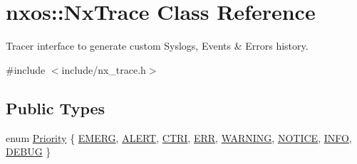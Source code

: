 \hypertarget{classnxos_1_1_nx_trace}{}\section{nxos\+:\+:Nx\+Trace Class Reference}
\label{classnxos_1_1_nx_trace}


Tracer interface to generate custom Syslogs, Events \& Errors history.  




{\ttfamily \#include $<$include/nx\+\_\+trace.\+h$>$}

\subsection*{Public Types}
\begin{DoxyCompactItemize}
\item 
enum \mbox{\hyperlink{classnxos_1_1_nx_trace_a582f6e5a22e788c61807657f8bca088f}{Priority}} \{ \newline
\mbox{\hyperlink{classnxos_1_1_nx_trace_a582f6e5a22e788c61807657f8bca088fa162b57da846293468dd47af10c603df2}{E\+M\+E\+RG}}, 
\mbox{\hyperlink{classnxos_1_1_nx_trace_a582f6e5a22e788c61807657f8bca088fa8733d052a42f110d6638988de5b6e4e4}{A\+L\+E\+RT}}, 
\mbox{\hyperlink{classnxos_1_1_nx_trace_a582f6e5a22e788c61807657f8bca088fad47bf23377867d39c4d53d2b2689b4da}{C\+T\+RI}}, 
\mbox{\hyperlink{classnxos_1_1_nx_trace_a582f6e5a22e788c61807657f8bca088faeac0f6db2341c975bf8e46d34496eb08}{E\+RR}}, 
\newline
\mbox{\hyperlink{classnxos_1_1_nx_trace_a582f6e5a22e788c61807657f8bca088fab187ad33eec7a961a9b1f3c787ecd003}{W\+A\+R\+N\+I\+NG}}, 
\mbox{\hyperlink{classnxos_1_1_nx_trace_a582f6e5a22e788c61807657f8bca088fac0c5faafc7a08a2bb2388c2d6c670936}{N\+O\+T\+I\+CE}}, 
\mbox{\hyperlink{classnxos_1_1_nx_trace_a582f6e5a22e788c61807657f8bca088fae821a1cd215dd3a51942abd8af16f36e}{I\+N\+FO}}, 
\mbox{\hyperlink{classnxos_1_1_nx_trace_a582f6e5a22e788c61807657f8bca088faa682e4987de0b7ca5b5474c68bbf9d4e}{D\+E\+B\+UG}}
 \}
\end{DoxyCompactItemize}
